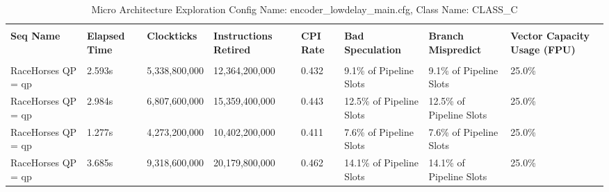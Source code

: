 \documentclass{article}%
\begin{document}
\newpage%
\begin{longtabu}{| X[l] | X[l] | X[l] | X[l] | X[l] | X[l] | X[l] | X[l] |}%
\caption{%
Micro Architecture Exploration\newline%
 Config Name: encoder\_lowdelay\_main.cfg,\newline%
 Class Name: CLASS\_C\newline%
%
}%
\hline%
&&&&&&&\\%
\textbf{Seq Name}&\textbf{Elapsed Time}&\textbf{Clockticks}&\textbf{Instructions Retired}&\textbf{CPI Rate}&\textbf{Bad Speculation}&\textbf{Branch Mispredict}&\textbf{Vector Capacity Usage (FPU)}\\%
&&&&&&&\\%
\hline%
\endhead%
RaceHorses\newline%
 QP = qp&2.593s&5,338,800,000&12,364,200,000&0.432&9.1\% of Pipeline Slots&9.1\% of Pipeline Slots&25.0\%\\%
\hline%
RaceHorses\newline%
 QP = qp&2.984s&6,807,600,000&15,359,400,000&0.443&12.5\% of Pipeline Slots&12.5\% of Pipeline Slots&25.0\%\\%
\hline%
RaceHorses\newline%
 QP = qp&1.277s&4,273,200,000&10,402,200,000&0.411&7.6\% of Pipeline Slots&7.6\% of Pipeline Slots&25.0\%\\%
\hline%
RaceHorses\newline%
 QP = qp&3.685s&9,318,600,000&20,179,800,000&0.462&14.1\% of Pipeline Slots&14.1\% of Pipeline Slots&25.0\%\\%
\hline%
\end{longtabu}%
\end{document}
